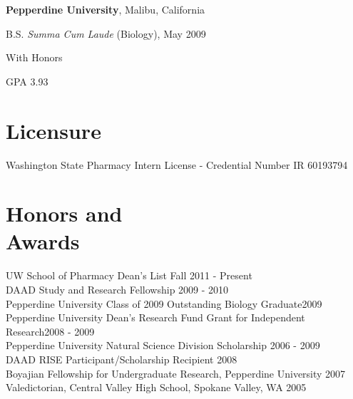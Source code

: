 \documentclass[margin,line]{resume}
\begin{document}
\begin{resume}
    {\bf Pepperdine University}, Malibu, California \vspace{2mm}%
    \begin{list1}
    \item[] B.S. {\it Summa Cum Laude} (Biology), May 2009
    \begin{list2}
        \vspace*{1mm}
        \item With Honors
        \item GPA 3.93
    \end{list2}
    \end{list1}

    \section{\mysidestyle Licensure}
    Washington State Pharmacy Intern License - Credential Number IR 60193794




    \section{\mysidestyle Honors and\\Awards} 

    UW School of Pharmacy Dean's List \hfill Fall 2011 - Present \\
    DAAD Study and Research Fellowship \hfill 2009 - 2010 \\
    Pepperdine University Class of 2009 Outstanding Biology Graduate\hfill 2009 \\
    Pepperdine University Dean's Research Fund Grant for Independent Research\hfill 2008 - 2009 \\
    Pepperdine University Natural Science Division Scholarship \hfill 2006 - 2009\\
    DAAD RISE Participant/Scholarship Recipient \hfill 2008 \\
    Boyajian Fellowship for Undergraduate Research, Pepperdine University \hfill 2007 \\
    Valedictorian, Central Valley High School, Spokane Valley, WA \hfill 2005 




\end{resume}
\end{document}
